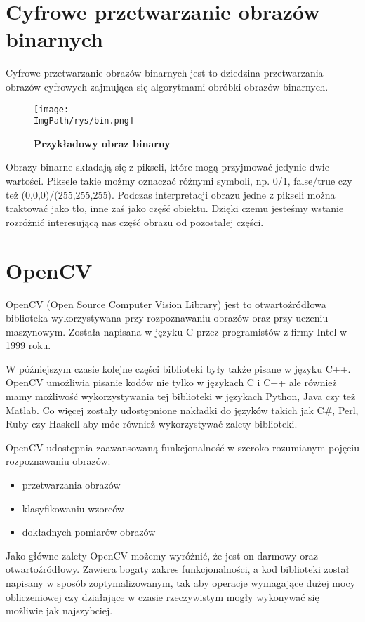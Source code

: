 \documentclass[a4paper,12pt,twoside,openany]{report}
\newcommand{\ImgPath}{.}
\begin{document}
\section{Cyfrowe przetwarzanie obrazów binarnych}
Cyfrowe przetwarzanie obrazów binarnych jest to dziedzina przetwarzania obrazów cyfrowych zajmująca się algorytmami obróbki obrazów binarnych. 

\begin{figure}[H]	
	\centering
	\texttt{[image: \\ImgPath/rys/bin.png]}
	
	\caption{  \textbf{Przykładowy obraz binarny}}
\end{figure}

Obrazy binarne składają się z pikseli, które mogą przyjmować jedynie dwie wartości. Piksele takie możmy oznaczać różnymi symboli, np. 0/1, false/true czy też (0,0,0)/(255,255,255). Podczas interpretacji obrazu jedne z pikseli można traktować jako tło, inne zaś jako część obiektu. Dzięki czemu jesteśmy wstanie rozróżnić interesującą nas część obrazu od pozostałej części. 

\section{OpenCV}
OpenCV (Open Source Computer Vision Library) jest to otwartoźródłowa biblioteka wykorzystywana przy rozpoznawaniu obrazów oraz przy uczeniu maszynowym. Została napisana w języku C przez programistów z firmy Intel w 1999 roku.

W późniejszym czasie kolejne części biblioteki były także pisane w języku C++. OpenCV umożliwia pisanie kodów nie tylko w językach C i C++ ale również mamy możliwość wykorzystywania tej biblioteki w językach Python, Java czy też Matlab. Co więcej zostały udostępnione nakładki do języków takich jak C\#, Perl, Ruby czy Haskell aby móc również wykorzystywać zalety  biblioteki. 

OpenCV udostępnia zaawansowaną funkcjonalność  w szeroko rozumianym pojęciu rozpoznawaniu obrazów:

\begin{itemize}
	\item przetwarzania obrazów
	\item klasyfikowaniu wzorców
	\item dokładnych pomiarów obrazów
\end{itemize}

Jako główne zalety OpenCV możemy wyróżnić, że jest on darmowy oraz otwartoźródłowy. Zawiera bogaty zakres funkcjonalności, a kod biblioteki został napisany w sposób zoptymalizowanym, tak aby operacje wymagające dużej mocy obliczeniowej czy działające w czasie rzeczywistym mogły wykonywać się możliwie jak najszybciej.
\end{document}
